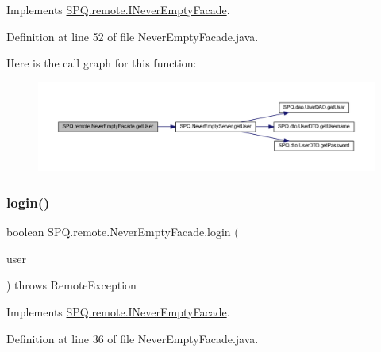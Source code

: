 Implements \mbox{\hyperlink{interface_s_p_q_1_1remote_1_1_i_never_empty_facade_aa329dfc23ab0832e73802bf2df90b9e0}{S\+P\+Q.\+remote.\+I\+Never\+Empty\+Facade}}.



Definition at line 52 of file Never\+Empty\+Facade.\+java.

Here is the call graph for this function\+:
\nopagebreak
\begin{figure}[H]
\begin{center}
\leavevmode
\includegraphics[width=350pt]{class_s_p_q_1_1remote_1_1_never_empty_facade_a32679a25e12c8a33e84087de357cd616_cgraph}
\end{center}
\end{figure}
\mbox{\label{class_s_p_q_1_1remote_1_1_never_empty_facade_a3fdd96efa1256ea520a497b8a20578e8}} 
\subsubsection{\texorpdfstring{login()}{login()}}
{\footnotesize\ttfamily boolean S\+P\+Q.\+remote.\+Never\+Empty\+Facade.\+login (\begin{DoxyParamCaption}\item[{\mbox{\hyperlink{class_s_p_q_1_1dto_1_1_user_d_t_o}{User\+D\+TO}}}]{user }\end{DoxyParamCaption}) throws Remote\+Exception}



Implements \mbox{\hyperlink{interface_s_p_q_1_1remote_1_1_i_never_empty_facade_a2440fa36695c63e4e4c30fc25965f853}{S\+P\+Q.\+remote.\+I\+Never\+Empty\+Facade}}.



Definition at line 36 of file Never\+Empty\+Facade.\+java.

